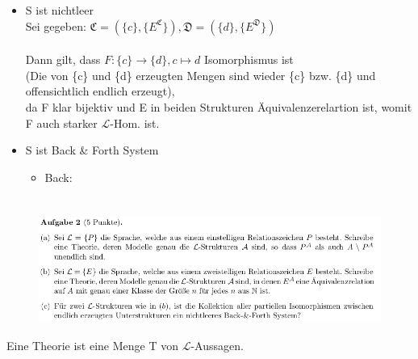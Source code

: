 \documentclass[a4paper]{scrartcl}
\begin{document}
    \begin{itemize}
        \item S ist nichtleer\\
            Sei gegeben: $\mathfrak{C} = (\{c\}, \{E^\mathfrak{C}\}), \mathfrak{D} = (\{d\}, \{E^\mathfrak{D}\})$\\
            \\Dann gilt, dass $F: \{c\} \rightarrow \{d\}, c \mapsto d$ Isomorphismus ist
            \\(Die von \{c\} und \{d\} erzeugten Mengen sind wieder \{c\} bzw. \{d\} und offensichtlich endlich erzeugt),\\
            da F klar bijektiv und E in beiden Strukturen Äquivalenzerelartion ist, womit F auch starker $\mathscr{L}$-Hom. ist.\\

        \item S ist Back & Forth System\\
            \begin{itemize}
                \item Back:\\
                    

            \end{itemize}
    \end{itemize}
    



\section*{}%
\label{sec:aufgabe_2}

    \begin{figure}[H]
        \centering
        \includegraphics[scale=0.6]{./A-2.png}
        \label{fig:}
    \end{figure}

    Eine Theorie ist eine Menge T von $\mathscr{L}$-Aussagen.
\end{document}
